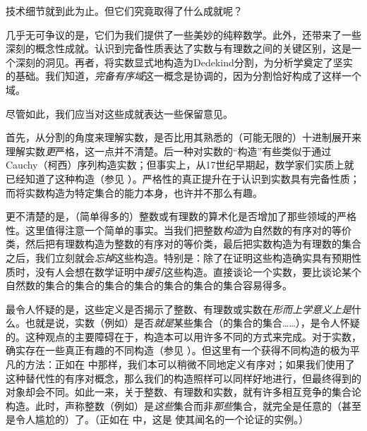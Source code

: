 \documentclass[../../../include/open-logic-section]{subfiles}
\begin{document}

技术细节就到此为止。但它们究竟取得了什么成就呢？

几乎无可争议的是，它们为我们提供了一些{美妙}的纯粹数学。此外，还带来了一些深刻的概念性成就。认识到完备性质表达了实数与有理数之间的关键区别，这是一个深刻的洞见。再者，将实数显式地构造为Dedekind分割，为分析学奠定了坚实的基础。我们知道，\emph{完备有序域}这一概念是协调的，因为分割恰好构成了这样一个域。

尽管如此，我们应当对这些成就表达一些保留意见。

首先，从分割的角度来理解实数，是否比用其熟悉的（可能无限的）十进制展开来理解实数\emph{更}严格，这一点并不清楚。后一种对实数的“构造”有些类似于通过 Cauchy（柯西）序列构造实数；但事实上，从17世纪早期起，数学家们实质上就已经知道了这种构造（参见 ）。严格性的真正提升在于认识到实数具有完备性质；而将实数构造为特定集合的能力本身，也许并不那么有趣。

更不清楚的是，（简单得多的）整数或有理数的算术化是否增加了那些领域的严格性。这里值得注意一个简单的事实。当我们把整数\emph{构造}为自然数的有序对的等价类，然后把有理数构造为整数的有序对的等价类，最后把实数构造为有理数的集合之后，我们立刻就会\emph{忘掉}这些构造。特别是：除了在证明这些构造确实具有预期性质时，没有人会想在数学证明中\emph{援引}这些构造。直接谈论一个实数，要比谈论某个自然数的集合的集合的集合的集合的集合的集合的集合容易得多。
%
%
%

最令人怀疑的是，这些定义是否揭示了整数、有理数或实数在\emph{形而上学意义上}\emph{是}什么。也就是说，实数（例如）是否\emph{就是}某些集合（的集合的集合……），是令人怀疑的。这种观点的主要障碍在于，构造本可以用许多不同的方式来完成。对于实数，确实存在一些真正有趣的不同构造（参见 ）。但这里有一个获得不同构造的极为平凡的方法：正如在  中那样，我们本可以稍微不同地定义有序对；如果我们使用了这种替代性的有序对概念，那么我们的构造照样可以同样好地进行，但最终得到的对象却会不同。如此一来，关于整数、有理数和实数，就有许多相互竞争的集合论构造。此时，声称整数（例如）是\emph{这些}集合而非\emph{那些}集合，就完全是任意的（甚至是令人尴尬的）了。（正如在  中，这是 \citealt{Benacerraf1965} 使其闻名的一个论证的实例。）
\end{document}
